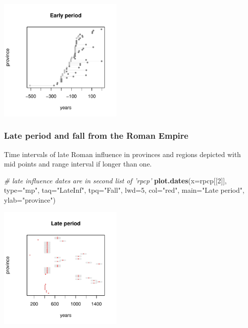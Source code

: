 \documentclass[a4paper,11pt]{memoir}
\newenvironment{Shaded}{\begin{snugshade}}{\end{snugshade}}
\newcommand{\CommentTok}[1]{\textcolor[rgb]{0.56,0.35,0.01}{\textit{#1}}}
\newcommand{\DataTypeTok}[1]{\textcolor[rgb]{0.13,0.29,0.53}{#1}}
\newcommand{\DecValTok}[1]{\textcolor[rgb]{0.00,0.00,0.81}{#1}}
\newcommand{\KeywordTok}[1]{\textcolor[rgb]{0.13,0.29,0.53}{\textbf{#1}}}
\newcommand{\NormalTok}[1]{#1}
\newcommand{\StringTok}[1]{\textcolor[rgb]{0.31,0.60,0.02}{#1}}
\begin{document}
\begin{center}
\centering
\includegraphics[width=6cm, trim=0 0 0 0, clip]{img/unnamed-chunk-22-1} %
\end{center}

\hypertarget{late-period-and-fall-from-the-roman-empire}{%
\subsubsection{Late period and fall from the Roman
Empire}\label{late-period-and-fall-from-the-roman-empire}}

Time intervals of late Roman influence in provinces and regions depicted
with mid points and range interval if longer than one.

\begin{Shaded}
\begin{Highlighting}[]
\CommentTok{# late influence dates are in second list of 'rpcp'}
\KeywordTok{plot.dates}\NormalTok{(}\DataTypeTok{x=}\NormalTok{rpcp[[}\DecValTok{2}\NormalTok{]], }\DataTypeTok{type=}\StringTok{"mp"}\NormalTok{, }\DataTypeTok{taq=}\StringTok{"LateInf"}\NormalTok{, }\DataTypeTok{tpq=}\StringTok{"Fall"}\NormalTok{, }\DataTypeTok{lwd=}\DecValTok{5}\NormalTok{, }\DataTypeTok{col=}\StringTok{"red"}\NormalTok{, }
           \DataTypeTok{main=}\StringTok{"Late period"}\NormalTok{, }\DataTypeTok{ylab=}\StringTok{"province"}\NormalTok{)}
\end{Highlighting}
\end{Shaded}

\begin{center}
\centering
\includegraphics[width=6cm, trim=0 0 0 0, clip]{img/unnamed-chunk-24-1} %
\end{center}
\end{document}
